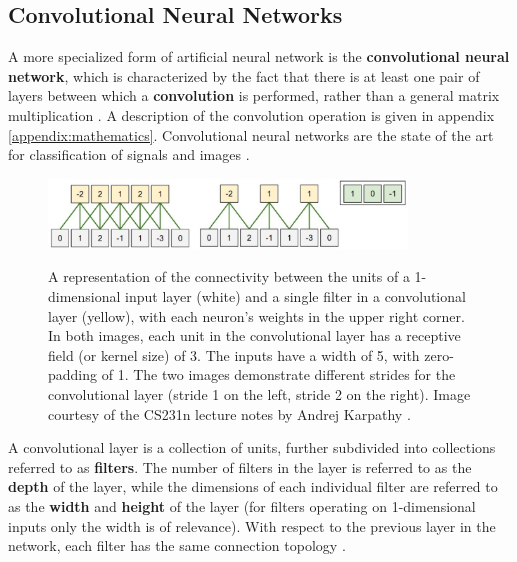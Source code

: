 \documentclass[12pt, titlepage]{report}
\theoremstyle{definition}
\begin{document}
\subsection{Convolutional Neural Networks}
A more specialized form of artificial neural network is the \textbf{convolutional neural network}, which is characterized by the fact that there is at least one pair of layers between which a \textbf{convolution} is performed, rather than a general matrix multiplication \cite[p. 326]{goodfellow2016deep}. A description of the convolution operation is given in appendix \ref{appendix:mathematics}. Convolutional neural networks are the state of the art for classification of signals and images \cite[p. 326]{goodfellow2016deep}.

\begin{figure}
\centering
\includegraphics[width=0.85\textwidth]{img/convolution.png}\\
\caption{A representation of the connectivity between the units of a 1-dimensional input layer (white) and a single filter in a convolutional layer (yellow), with each neuron's weights in the upper right corner. In both images, each unit in the convolutional layer has a receptive field (or kernel size) of 3. The inputs have a width of 5, with zero-padding of 1. The two images demonstrate different strides for the convolutional layer (stride 1 on the left, stride 2 on the right). Image courtesy of the CS231n lecture notes by Andrej Karpathy \cite[Convolutional Neural Networks: Architectures, Convolution / Pooling Layers]{karpathy2017cs231n}.}
\label{figure:convolution1d}
\end{figure}

A convolutional layer is a collection of units, further subdivided into collections referred to as \textbf{filters}. The number of filters in the layer is referred to as the \textbf{depth} of the layer, while the dimensions of each individual filter are referred to as the \textbf{width} and \textbf{height} of the layer (for filters operating on 1-dimensional inputs only the width is of relevance). With respect to the previous layer in the network, each filter has the same connection topology \cite[Convolutional Neural Networks: Architectures, Convolution / Pooling Layers]{karpathy2017cs231n}.
\end{document}

